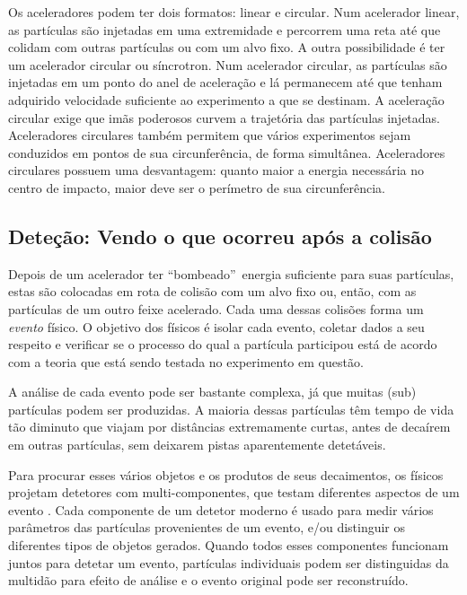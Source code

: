 Os aceleradores podem ter dois formatos: linear e
circular. Num acelerador linear, as partículas são
injetadas em uma extremidade e percorrem uma reta até que colidam com outras
partículas ou com um alvo fixo. A outra possibilidade é ter um acelerador
circular ou
síncrotron. Num acelerador circular, as partículas são injetadas em um ponto
do anel de aceleração e lá permanecem até que tenham adquirido velocidade
suficiente ao experimento a que se destinam. A aceleração circular exige que
imãs poderosos curvem a trajetória das partículas injetadas. Aceleradores
circulares também permitem que vários experimentos sejam conduzidos em pontos
de sua circunferência, de forma simultânea. Aceleradores circulares possuem
uma desvantagem: quanto maior a energia necessária no centro de impacto, maior
deve ser o perímetro de sua circunferência.

\subsection{Deteção: Vendo o que ocorreu a\-pós a coli\-são}

Depois de um acelerador ter ``bombeado''\ energia suficiente para suas
par\-tí\-culas, estas são colocadas em rota de colisão com um alvo fixo ou,
então, com as partículas de um outro feixe acelerado. Cada uma dessas colisões
forma um \emph{evento} físico. O objetivo dos físicos é isolar cada evento,
coletar dados a seu respeito e verificar se o processo do qual a partícula
participou está de acordo com a teoria que está sendo testada no experimento
em questão.

A análise de cada evento pode ser bastante complexa, já que muitas (sub)
par\-tí\-cu\-las podem ser produzidas. A maioria dessas partículas têm tempo
de vida tão diminuto que viajam por distâncias extremamente curtas, antes de
decaírem em outras partículas, sem deixarem pistas aparentemente detetáveis.

Para procurar esses vários objetos e os produtos de seus decaimentos, os
físicos projetam detetores com multi-componentes, que testam diferentes
aspectos de um evento \cite{d0, cms, atlas-tp, booth}. Cada componente de um
detetor moderno é usado para medir vários parâmetros das partículas
provenientes de um evento, e/ou distinguir os diferentes tipos de objetos
gerados.  Quando todos esses componentes funcionam juntos para detetar um
evento, partículas individuais podem ser distinguidas da multidão para efeito
de análise e o evento original pode ser reconstruído.

